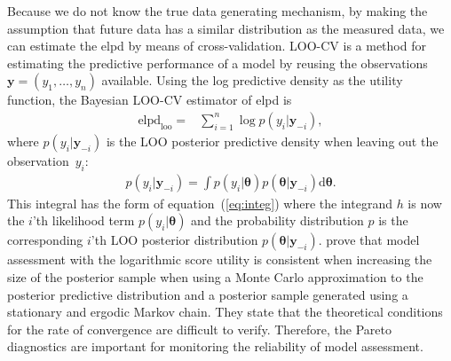 \documentclass[12pt]{article}
\newenvironment{nalign}{
    \begin{equation}
    \begin{aligned}
}{
    \end{aligned}
    \end{equation}
    \ignorespacesafterend
}
\begin{document}
Because we do not know the true data generating mechanism, by making the assumption
that future data has a similar distribution as the measured data, we
can estimate the elpd by means of cross-validation.
LOO-CV is a method for estimating the predictive performance of a model by 
reusing the observations $\mathbf{y} = ( y_1, \ldots , y_n)$ available.
%
%
Using the log predictive density as the utility function,
the Bayesian LOO-CV estimator of elpd is
\begin{nalign} \label{eq:naive}
\text{elpd}_{\text{loo}} = & \sum_{i = 1}^{n} \log p (y_i | \mathbf{y}_{-i}),
%
\end{nalign}
%
where $p (y_i | \mathbf{y}_{-i})$ is the LOO posterior predictive density when leaving out the observation~$y_i$:
%
%
%
%
\begin{nalign} \label{eq:loopd}
p (y_i | \mathbf{y}_{-i}) = \int p (y_i | \boldsymbol{\theta}) p (\boldsymbol{\theta} | \mathbf{y}_{-i} ) \text{d} \boldsymbol{\theta} .
\end{nalign}
%
This integral has the form of equation~(\ref{eq:integ}) where the integrand $h$ is now the $i$'th likelihood term $p (y_i | \boldsymbol{\theta})$
and the probability distribution $p$ is
%
the corresponding $i$'th LOO posterior distribution $p (\boldsymbol{\theta} | \mathbf{y}_{-i} )$.
%
%
%
%
%
\citet{krueger2016probabilistic} prove that model assessment with the logarithmic score utility
is consistent when increasing the size of the posterior sample when using a Monte Carlo approximation to the posterior predictive distribution and a posterior sample generated using
a stationary and ergodic Markov chain.
They state that the theoretical conditions for the rate of convergence are difficult to verify.
Therefore, the Pareto diagnostics are important for monitoring the reliability of
model assessment.



\end{document}
